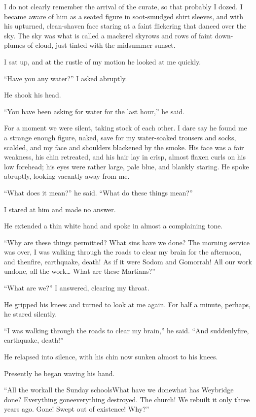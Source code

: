 I do not clearly remember the arrival of the curate, so that
probably I dozed. I became aware of him as a seated figure in
soot-smudged shirt sleeves, and with his upturned, clean-shaven
face staring at a faint flickering that danced over the sky. The
sky was what is called a mackerel sky\dash{}rows and rows of faint
down-plumes of cloud, just tinted with the midsummer sunset.

I sat up, and at the rustle of my motion he looked at me quickly.

``Have you any water?'' I asked abruptly.

He shook his head.

``You have been asking for water for the last hour,'' he said.

For a moment we were silent, taking stock of each other. I dare say
he found me a strange enough figure, naked, save for my
water-soaked trousers and socks, scalded, and my face and shoulders
blackened by the smoke. His face was a fair weakness, his chin
retreated, and his hair lay in crisp, almost flaxen curls on his
low forehead; his eyes were rather large, pale blue, and blankly
staring. He spoke abruptly, looking vacantly away from me.

``What does it mean?'' he said. ``What do these things mean?''

I stared at him and made no answer.

He extended a thin white hand and spoke in almost a complaining
tone.

``Why are these things permitted? What sins have we done? The
morning service was over, I was walking through the roads to clear
my brain for the afternoon, and then\dash{}fire, earthquake, death! As
if it were Sodom and Gomorrah! All our work undone, all the
work\ldots{} What are these Martians?''

``What are we?'' I answered, clearing my throat.

He gripped his knees and turned to look at me again. For half a
minute, perhaps, he stared silently.

``I was walking through the roads to clear my brain,'' he said. ``And
suddenly\dash{}fire, earthquake, death!''

He relapsed into silence, with his chin now sunken almost to his
knees.

Presently he began waving his hand.

``All the work\dash{}all the Sunday schools\dash{}What have we done\dash{}what has
Weybridge done? Everything gone\dash{}everything destroyed. The church!
We rebuilt it only three years ago. Gone! Swept out of existence!
Why?''

